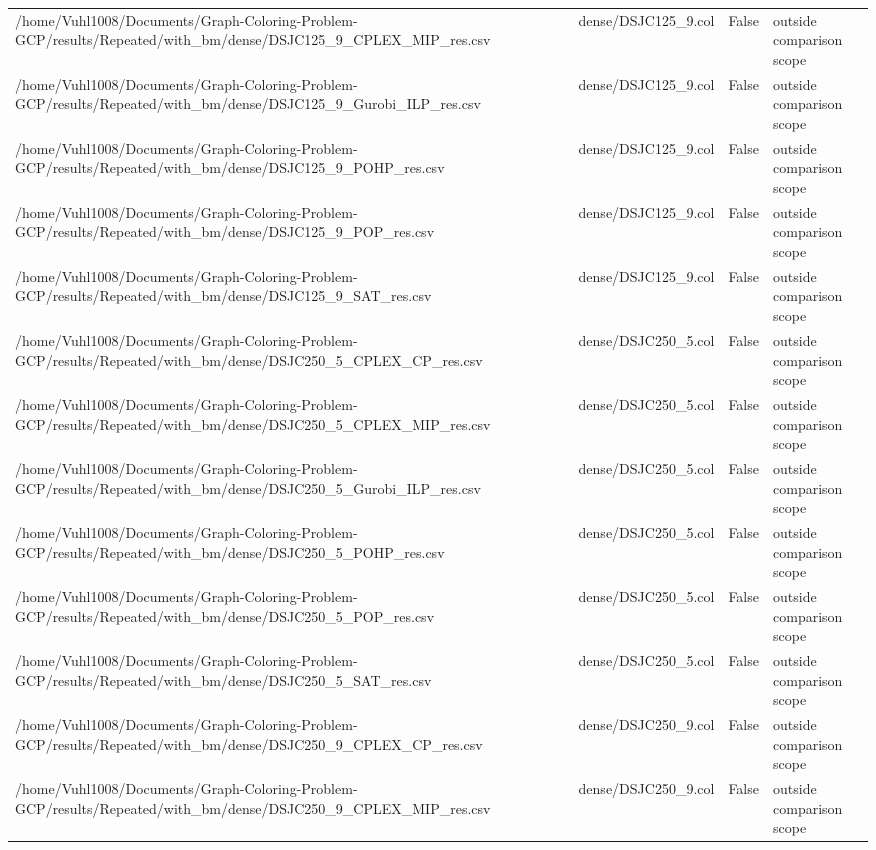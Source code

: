 \begin{table}[htbp]
\begin{tabular}{llll}
/home/Vuhl1008/Documents/Graph-Coloring-Problem-GCP/results/Repeated/with\_bm/dense/DSJC125\_9\_CPLEX\_MIP\_res.csv & dense/DSJC125\_9.col & False & outside comparison scope \\
/home/Vuhl1008/Documents/Graph-Coloring-Problem-GCP/results/Repeated/with\_bm/dense/DSJC125\_9\_Gurobi\_ILP\_res.csv & dense/DSJC125\_9.col & False & outside comparison scope \\
/home/Vuhl1008/Documents/Graph-Coloring-Problem-GCP/results/Repeated/with\_bm/dense/DSJC125\_9\_POHP\_res.csv & dense/DSJC125\_9.col & False & outside comparison scope \\
/home/Vuhl1008/Documents/Graph-Coloring-Problem-GCP/results/Repeated/with\_bm/dense/DSJC125\_9\_POP\_res.csv & dense/DSJC125\_9.col & False & outside comparison scope \\
/home/Vuhl1008/Documents/Graph-Coloring-Problem-GCP/results/Repeated/with\_bm/dense/DSJC125\_9\_SAT\_res.csv & dense/DSJC125\_9.col & False & outside comparison scope \\
/home/Vuhl1008/Documents/Graph-Coloring-Problem-GCP/results/Repeated/with\_bm/dense/DSJC250\_5\_CPLEX\_CP\_res.csv & dense/DSJC250\_5.col & False & outside comparison scope \\
/home/Vuhl1008/Documents/Graph-Coloring-Problem-GCP/results/Repeated/with\_bm/dense/DSJC250\_5\_CPLEX\_MIP\_res.csv & dense/DSJC250\_5.col & False & outside comparison scope \\
/home/Vuhl1008/Documents/Graph-Coloring-Problem-GCP/results/Repeated/with\_bm/dense/DSJC250\_5\_Gurobi\_ILP\_res.csv & dense/DSJC250\_5.col & False & outside comparison scope \\
/home/Vuhl1008/Documents/Graph-Coloring-Problem-GCP/results/Repeated/with\_bm/dense/DSJC250\_5\_POHP\_res.csv & dense/DSJC250\_5.col & False & outside comparison scope \\
/home/Vuhl1008/Documents/Graph-Coloring-Problem-GCP/results/Repeated/with\_bm/dense/DSJC250\_5\_POP\_res.csv & dense/DSJC250\_5.col & False & outside comparison scope \\
/home/Vuhl1008/Documents/Graph-Coloring-Problem-GCP/results/Repeated/with\_bm/dense/DSJC250\_5\_SAT\_res.csv & dense/DSJC250\_5.col & False & outside comparison scope \\
/home/Vuhl1008/Documents/Graph-Coloring-Problem-GCP/results/Repeated/with\_bm/dense/DSJC250\_9\_CPLEX\_CP\_res.csv & dense/DSJC250\_9.col & False & outside comparison scope \\
/home/Vuhl1008/Documents/Graph-Coloring-Problem-GCP/results/Repeated/with\_bm/dense/DSJC250\_9\_CPLEX\_MIP\_res.csv & dense/DSJC250\_9.col & False & outside comparison scope \\

\end{tabular}
\end{table}

